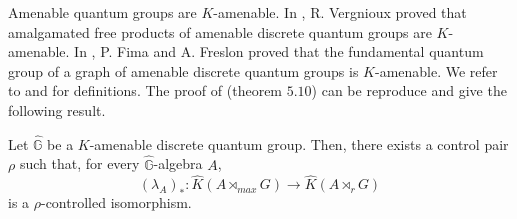 Amenable quantum groups are $K$-amenable. In \cite{VergniouxKamenability}, R. Vergnioux proved that amalgamated free products of amenable discrete quantum groups are $K$-amenable. In \cite{FimaGraphs}, P. Fima and A. Freslon proved that the fundamental quantum group of a graph of amenable discrete quantum groups is $K$-amenable. We refer to \cite{VergniouxKamenability} and \cite{FimaGraphs} for definitions. The proof of \cite{OY2} (theorem $5.10$) can be reproduce and give the following result.

\begin{prop}
Let $\hat{\mathbb G}$ be a $K$-amenable discrete quantum group. Then, there exists a control pair $\rho$ such that, for every $\hat{\mathbb G}$-algebra $A$,
\[(\lambda_A)_* : \hat K(A\rtimes_{max} G) \rightarrow \hat K(A\rtimes_r G) \]
is a $\rho$-controlled isomorphism.
\end{prop}





























   
